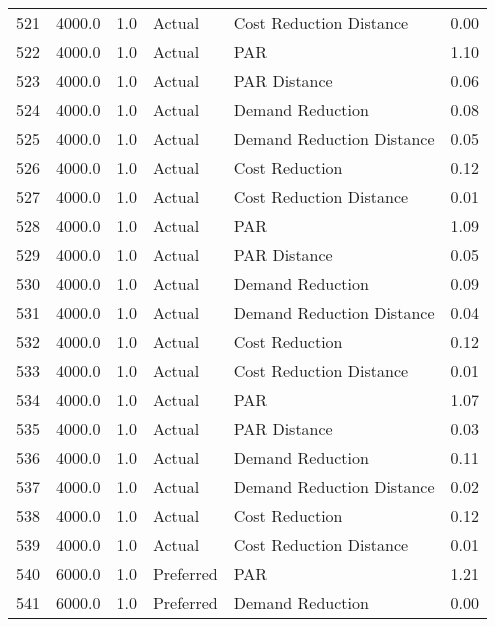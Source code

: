 \begin{longtable}{lrrllr}
521  &       4000.0 &     1.0 &         Actual &    Cost Reduction Distance &   0.00 \\
522  &       4000.0 &     1.0 &         Actual &                        PAR &   1.10 \\
523  &       4000.0 &     1.0 &         Actual &               PAR Distance &   0.06 \\
524  &       4000.0 &     1.0 &         Actual &           Demand Reduction &   0.08 \\
525  &       4000.0 &     1.0 &         Actual &  Demand Reduction Distance &   0.05 \\
526  &       4000.0 &     1.0 &         Actual &             Cost Reduction &   0.12 \\
527  &       4000.0 &     1.0 &         Actual &    Cost Reduction Distance &   0.01 \\
528  &       4000.0 &     1.0 &         Actual &                        PAR &   1.09 \\
529  &       4000.0 &     1.0 &         Actual &               PAR Distance &   0.05 \\
530  &       4000.0 &     1.0 &         Actual &           Demand Reduction &   0.09 \\
531  &       4000.0 &     1.0 &         Actual &  Demand Reduction Distance &   0.04 \\
532  &       4000.0 &     1.0 &         Actual &             Cost Reduction &   0.12 \\
533  &       4000.0 &     1.0 &         Actual &    Cost Reduction Distance &   0.01 \\
534  &       4000.0 &     1.0 &         Actual &                        PAR &   1.07 \\
535  &       4000.0 &     1.0 &         Actual &               PAR Distance &   0.03 \\
536  &       4000.0 &     1.0 &         Actual &           Demand Reduction &   0.11 \\
537  &       4000.0 &     1.0 &         Actual &  Demand Reduction Distance &   0.02 \\
538  &       4000.0 &     1.0 &         Actual &             Cost Reduction &   0.12 \\
539  &       4000.0 &     1.0 &         Actual &    Cost Reduction Distance &   0.01 \\
540  &       6000.0 &     1.0 &      Preferred &                        PAR &   1.21 \\
541  &       6000.0 &     1.0 &      Preferred &           Demand Reduction &   0.00 \\

\end{longtable}
